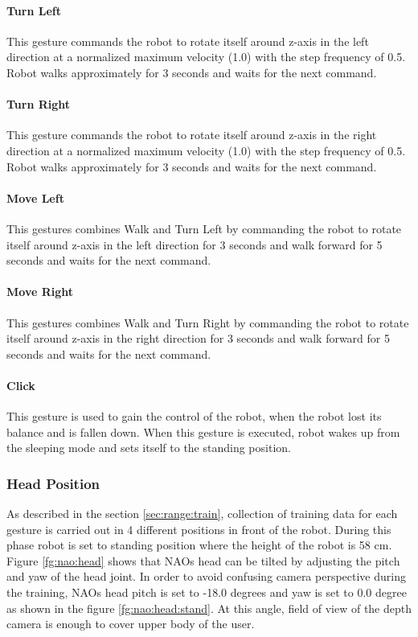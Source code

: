 \paragraph*{Turn Left} This gesture commands the robot to rotate itself around z-axis in the left direction at a normalized maximum velocity (1.0) with the step frequency of 0.5. Robot walks approximately for 3 seconds and waits for the next command.

\paragraph*{Turn Right} This gesture commands the robot to rotate itself around z-axis in the right direction at a normalized maximum velocity (1.0) with the step frequency of 0.5. Robot walks approximately for 3 seconds and waits for the next command.

\paragraph*{Move Left} This gestures combines Walk and Turn Left by commanding the robot to rotate itself around z-axis in the left direction for 3 seconds and walk forward for 5 seconds and waits for the next command.

\paragraph*{Move Right} This gestures combines Walk and Turn Right by commanding the robot to rotate itself around z-axis in the right direction for 3 seconds and walk forward for 5 seconds and waits for the next command.

\paragraph*{Click} This gesture is used to gain the control of the robot, when the robot lost its balance and is fallen down. When this gesture is executed, robot wakes up from the sleeping mode and sets itself to the standing position.



\subsubsection*{Head Position} As described in the section \ref{sec:range:train}, collection of training data for each gesture is carried out in 4 different positions in front of the robot. During this phase robot is set to standing position where the height of the robot is 58 cm. Figure \ref{fg:nao:head} shows that NAOs head can be tilted by adjusting the pitch and yaw of the head joint. In order to avoid confusing camera perspective during the training, NAOs head pitch is set to -18.0 degrees and yaw is set to 0.0 degree as shown in the figure \ref{fg:nao:head:stand}. At this angle, field of view of the depth camera is enough to cover upper body of the user. 


